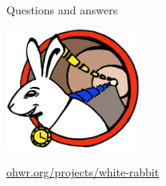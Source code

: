 \documentclass[compress,red]{beamer}
\begin{document}
\begin{frame}{Questions and answers}

    \begin{center}
    \includegraphics[height=4.0cm]{logo/WRlogo.jpg}
    \end{center}

\begin{center}
\href{http://ohwr.org/projects/white-rabbit}{ohwr.org/projects/white-rabbit}
\end{center}
\end{frame}
\end{document}
